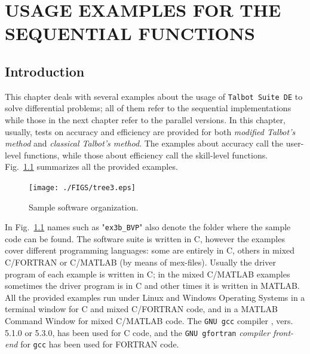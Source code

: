 \documentclass[a4paper,10pt]{report}%
\begin{document}
\chapter{USAGE EXAMPLES FOR THE SEQUENTIAL FUNCTIONS}\label{CHAPT2}

\section{Introduction}\label{CHAPT2:INTRO}
This chapter deals with several examples about the usage of {\tt Talbot Suite DE} to solve differential
problems; all of them refer to the sequential implementations while those in the next chapter refer to the
parallel versions.
In this chapter, usually, tests on accuracy and efficiency are provided for both {\em modified Talbot's method} and
{\em classical Talbot's method}.
The examples about accuracy call the user-level functions, while those about efficiency call the skill-level
functions.
\\
Fig.~\ref{TREE3} summarizes all the provided examples.
\begin{figure}[htb]
\centering
\texttt{[image: ./FIGS/tree3.eps]}
\caption{Sample software organization.}
\label{TREE3}
\end{figure}

\noindent In Fig.~\ref{TREE3} names such as "{\tt ex3b\_BVP}" also denote the folder where the sample code
can be found.
The software suite is written in C, however the examples cover different programming languages: some are
entirely in C, others in mixed C/FORTRAN or C/MATLAB (by means of mex-files). Usually the driver program of
each example is written in C; in the mixed C/MATLAB examples sometimes the driver program is in C and other
times it is written in MATLAB.
\\
All the provided examples run under Linux and Windows Operating Systems in a terminal window for C and mixed
C/FORTRAN code, and in a MATLAB Command Window for mixed C/MATLAB code.
The {\tt GNU gcc} compiler \cite{GNU:gcc}, vers. 5.1.0 or 5.3.0, has been used for C code, and the {\tt GNU gfortran} {\em compiler front-end} for {\tt gcc} has been used for FORTRAN code.
\end{document}
